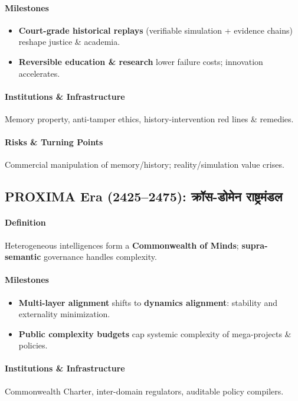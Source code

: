 \documentclass[11pt]{article}
\begin{document}
\begin{itemize}[noitemsep]
\begin{itemize}[noitemsep]
\begin{itemize}[noitemsep]
\begin{itemize}[noitemsep]
\begin{itemize}[noitemsep]
\begin{itemize}[noitemsep]
\paragraph{Milestones}
\begin{itemize}[noitemsep]
  \item \textbf{Court-grade historical replays} (verifiable simulation + evidence chains) reshape justice \& academia.
  \item \textbf{Reversible education \& research} lower failure costs; innovation accelerates.
\end{itemize}

\paragraph{Institutions \& Infrastructure} Memory property, anti-tamper ethics, history-intervention red lines \& remedies.

\paragraph{Risks \& Turning Points} Commercial manipulation of memory/history; reality/simulation value crises.

\subsection{PROXIMA Era (2425–2475): क्रॉस-डोमेन राष्ट्रमंडल}
\paragraph{Definition} Heterogeneous intelligences form a \textbf{Commonwealth of Minds}; \textbf{supra-semantic} governance handles complexity.

\paragraph{Milestones}
\begin{itemize}[noitemsep]
  \item \textbf{Multi-layer alignment} shifts to \textbf{dynamics alignment}: stability and externality minimization.
  \item \textbf{Public complexity budgets} cap systemic complexity of mega-projects \& policies.
\end{itemize}

\paragraph{Institutions \& Infrastructure} Commonwealth Charter, inter-domain regulators, auditable policy compilers.


\end{itemize}
\end{itemize}
\end{itemize}
\end{itemize}
\end{itemize}
\end{itemize}
\end{document}
